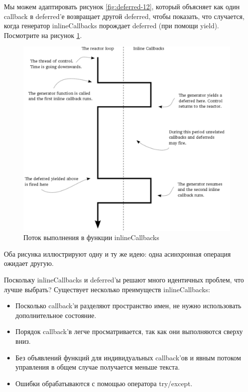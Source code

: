Мы можем адаптировать рисунок \ref{fig:deferred-12}, который 
объясняет как один callback в deferred'е возвращает другой deferred, 
чтобы показать, что случается, когда генератор 
inlineCallbacks порождает deferred (при помощи yield). 
Посмотрите на рисунок \ref{fig:inline-callbacks1}.

\newpage

\begin{figure}[h]
\begin{center}
    \includegraphics[height=0.5\textheight]{images/inline-callbacks1.pdf}
    \caption{Поток выполнения в функции inlineCallbacks\label{fig:inline-callbacks1}}
\end{center}
\end{figure}


Оба рисунка иллюстрируют одну и ту же идею: 
одна асинхронная операция ожидает другую.


Поскольку inlineCallbacks и deferred'ы решают много 
идентичных проблем, что лучше выбрать? Существует 
несколько преимуществ inlineCallbacks:

\begin{itemize}

\item Посколько callback'и разделяют пространство 
    имен, не нужно использовать дополнительное состояние.

\item Порядок callback'в легче просматривается, так как они 
    выполняются сверху вниз.
    
\item Без объявлений функций для индивидуальных 
    callback'ов и явным потоком управления в общем случае получается 
    меньше текста.

\item Ошибки обрабатываются с помощью оператора try/except.

\end{itemize}

